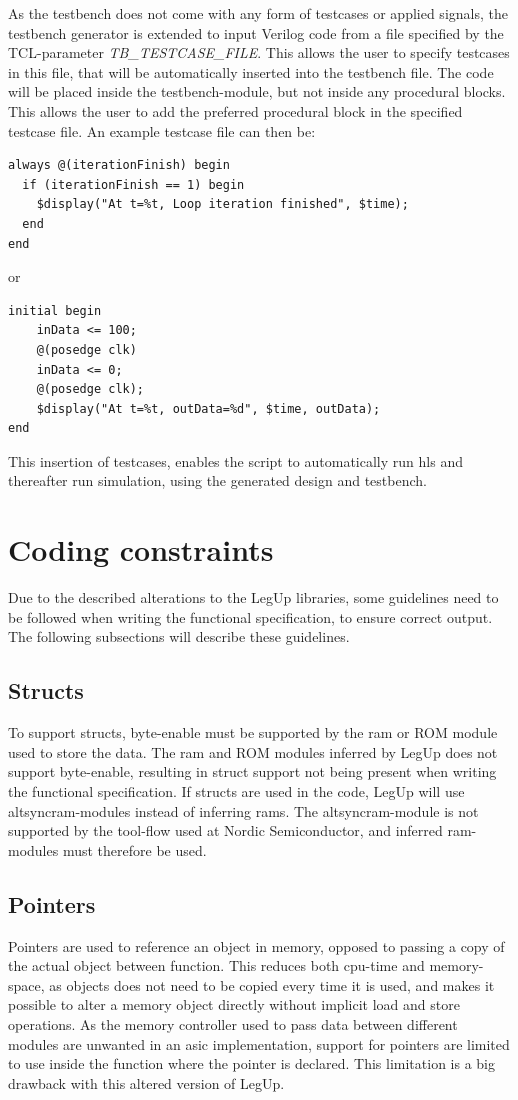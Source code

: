As the testbench does not come with any form of testcases or applied signals, the testbench generator is extended to input Verilog code from a file specified by the TCL-parameter \textit{TB\_TESTCASE\_FILE}. This allows the user to specify testcases in this file, that will be automatically inserted into the testbench file. The code will be placed inside the testbench-module, but not inside any procedural blocks. This allows the user to add the preferred procedural block in the specified testcase file. An example testcase file can then be:

\lstset{language=Verilog, style=Verilogstyle}
\begin{lstlisting}
always @(iterationFinish) begin
  if (iterationFinish == 1) begin
    $display("At t=%t, Loop iteration finished", $time);
  end
end
\end{lstlisting}
or
\begin{lstlisting}
initial begin
    inData <= 100;
    @(posedge clk)
    inData <= 0;
    @(posedge clk);
    $display("At t=%t, outData=%d", $time, outData);
end
\end{lstlisting}
This insertion of testcases, enables the script to automatically run \gls{hls} and thereafter run simulation, using the generated design and testbench.

\section{Coding constraints}
Due to the described alterations to the LegUp libraries, some guidelines need to be followed when writing the functional specification, to ensure correct output. The following subsections will describe these guidelines.
\subsection{Structs}
To support structs, byte-enable must be supported by the \gls{ram} or ROM module used to store the data. The \gls{ram} and ROM modules inferred by LegUp does not support byte-enable, resulting in struct support not being present when writing the functional specification. If structs are used in the code, LegUp will use altsyncram-modules instead of inferring \gls{ram}s. The altsyncram-module is not supported by the tool-flow used at Nordic Semiconductor, and inferred \gls{ram}-modules must therefore be used. 
\subsection{Pointers}
Pointers are used to reference an object in memory, opposed to passing a copy of the actual object between function. This reduces both \gls{cpu}-time and memory-space, as objects does not need to be copied every time it is used, and makes it possible to alter a memory object directly without implicit load and store operations. As the memory controller used to pass data between different modules are unwanted in an \gls{asic} implementation, support for pointers are limited to use inside the function where the pointer is declared. This limitation is a big drawback with this altered version of LegUp.
